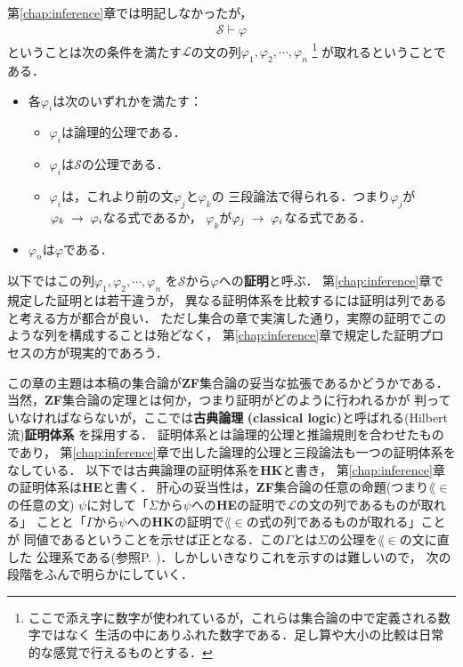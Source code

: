 	第\ref{chap:inference}章では明記しなかったが，
	\begin{align}
		\mathscr{S} \vdash \varphi
	\end{align}
	ということは次の条件を満たす$\mathcal{L}$の文の列$\varphi_{1},\varphi_{2},\cdots,\varphi_{n}$
	\footnote{
		ここで添え字に数字が使われているが，これらは集合論の中で定義される数字ではなく
		生活の中にありふれた数字である．足し算や大小の比較は日常的な感覚で行えるものとする．
	}
	が取れるということである．
	\begin{itemize}
		\item 各$\varphi_{i}$は次のいずれかを満たす：
			\begin{itemize}
				\item $\varphi_{i}$は論理的公理である．
				\item $\varphi_{i}$は$\mathscr{S}$の公理である．
				\item $\varphi_{i}$は，これより前の文$\varphi_{j}$と$\varphi_{k}$の
					三段論法で得られる．つまり$\varphi_{j}$が
					$\varphi_{k} \hspace{0.25em}\rightarrow\hspace{0.25em} \varphi_{i}$なる式であるか，
					$\varphi_{k}$が$\varphi_{j} \hspace{0.25em}\rightarrow\hspace{0.25em} \varphi_{i}$なる式である．
			\end{itemize}
		
		\item $\varphi_{n}$は$\varphi$である．
	\end{itemize}
	以下ではこの列$\varphi_{1},\varphi_{2},\cdots,\varphi_{n}$
	を$\mathscr{S}$から$\varphi$への{\bf 証明}と呼ぶ．
	第\ref{chap:inference}章で規定した証明とは若干違うが，
	異なる証明体系を比較するには証明は列であると考える方が都合が良い．
	ただし集合の章で実演した通り，実際の証明でこのような列を構成することは殆どなく，
	第\ref{chap:inference}章で規定した証明プロセスの方が現実的であろう．
	
	この章の主題は本稿の集合論が{\bf ZF}集合論の妥当な拡張であるかどうかである．
	当然，{\bf ZF}集合論の定理とは何か，つまり証明がどのように行われるかが
	判っていなければならないが，ここでは{\bf 古典論理}
	{\bf (classical logic)}と呼ばれる(Hilbert流){\bf 証明体系}
	を採用する．
	証明体系とは論理的公理と推論規則を合わせたものであり，
	第\ref{chap:inference}章で出した論理的公理と三段論法も一つの証明体系をなしている．
	以下では古典論理の証明体系を{\bf HK}と書き，
	第\ref{chap:inference}章の証明体系は{\bf HE}と書く．
	肝心の妥当性は，{\bf ZF}集合論の任意の命題(つまり$\lang{\in}$の任意の文)
	$\psi$に対して「$\Sigma$から$\psi$への{\bf HE}の証明で$\mathcal{L}$の文の列であるものが取れる」
	ことと「$\Gamma$から$\psi$への{\bf HK}の証明で$\lang{\in}$の式の列であるものが取れる」ことが
	同値であるということを示せば正となる．この$\Gamma$とは$\Sigma$の公理を$\lang{\in}$の文に直した
	公理系である(参照P. \pageref{axioms_of_Gamma})．しかしいきなりこれを示すのは難しいので，
	次の段階をふんで明らかにしていく．
	
